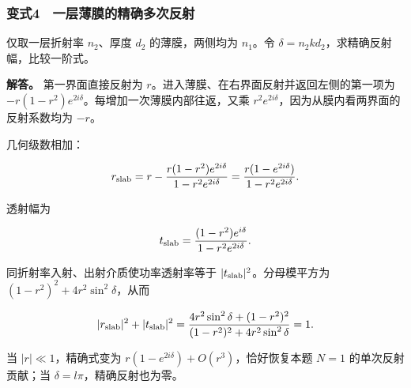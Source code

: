 \documentclass[12pt,a4paper,fontset=fandol]{ctexart}
\begin{document}
\par\noindent\begin{minipage}{\linewidth}
\setlength{\parindent}{2em}\setlength{\parskip}{.35em}
\subsubsection{变式4　一层薄膜的精确多次反射}\label{ux53d8ux5f0f4-ux4e00ux5c42ux8584ux819cux7684ux7cbeux786eux591aux6b21ux53cdux5c04}

仅取一层折射率 \(n_2\)、厚度 \(d_2\) 的薄膜，两侧均为 \(n_1\)。令
\(\delta=n_2kd_2\)，求精确反射幅，比较一阶式。

\textbf{解答。} 第一界面直接反射为
\(r\)。进入薄膜、在右界面反射并返回左侧的第一项为
\(-r(1-r^2)e^{2i\delta}\)。每增加一次薄膜内部往返，又乘
\(r^2e^{2i\delta}\)，因为从膜内看两界面的反射系数均为 \(-r\)。

几何级数相加：

\[
r_{\rm slab}=r-\frac{r(1-r^2)e^{2i\delta}}
{1-r^2e^{2i\delta}}
=\frac{r(1-e^{2i\delta})}{1-r^2e^{2i\delta}}.
\]

透射幅为

\[
t_{\rm slab}=\frac{(1-r^2)e^{i\delta}}
{1-r^2e^{2i\delta}}.
\]

同折射率入射、出射介质使功率透射率等于
\(|t_{\rm slab}|^2\)。分母模平方为 \((1-r^2)^2+4r^2\sin^2\delta\)，从而

\[
|r_{\rm slab}|^2+|t_{\rm slab}|^2
=\frac{4r^2\sin^2\delta+(1-r^2)^2}
{(1-r^2)^2+4r^2\sin^2\delta}=1.
\]

当 \(|r|\ll1\)，精确式变为 \(r(1-e^{2i\delta})+O(r^3)\)，恰好恢复本题
\(N=1\) 的单次反射贡献；当 \(\delta=l\pi\)，精确反射也为零。

\end{minipage}\par
\end{document}
